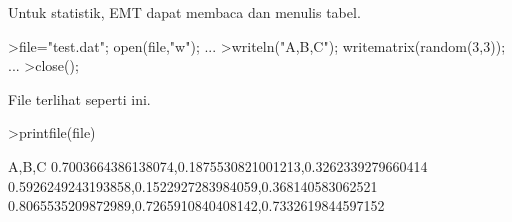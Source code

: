 \documentclass[a4paper,10pt]{article}
\begin{document}
\begin{eulernotebook}
\begin{eulercomment}
\begin{eulercomment}
\begin{eulercomment}
\begin{eulercomment}
\begin{eulercomment}
\begin{eulercomment}
\begin{euleroutput}
\end{euleroutput}
\begin{eulercomment}
Untuk statistik, EMT dapat membaca dan menulis tabel.
\end{eulercomment}
\begin{eulerprompt}
>file="test.dat"; open(file,"w"); ...
>writeln("A,B,C"); writematrix(random(3,3)); ...
>close();
\end{eulerprompt}
\begin{eulercomment}
File terlihat seperti ini.
\end{eulercomment}
\begin{eulerprompt}
>printfile(file)
\end{eulerprompt}
\begin{euleroutput}
  A,B,C
  0.7003664386138074,0.1875530821001213,0.3262339279660414
  0.5926249243193858,0.1522927283984059,0.368140583062521
  0.8065535209872989,0.7265910840408142,0.7332619844597152
  

\end{euleroutput}
\end{eulercomment}
\end{eulercomment}
\end{eulercomment}
\end{eulercomment}
\end{eulercomment}
\end{eulercomment}
\end{eulernotebook}
\end{document}
